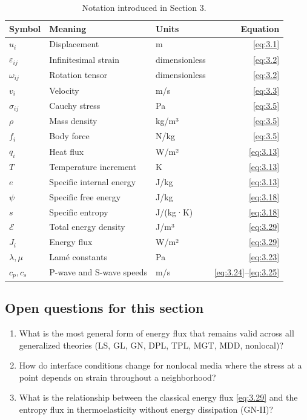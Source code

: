 \begin{table}[h]
\centering
\small
\caption{Notation introduced in Section 3.}
\label{tab:notation-sec3}
\begin{tabularx}{\textwidth}{@{}lXlr@{}}
\toprule
\textbf{Symbol} & \textbf{Meaning} & \textbf{Units} & \textbf{Equation} \\
\midrule
$u_i$ & Displacement & m & \eqref{eq:3.1} \\
$\varepsilon_{ij}$ & Infinitesimal strain & dimensionless & \eqref{eq:3.2} \\
$\omega_{ij}$ & Rotation tensor & dimensionless & \eqref{eq:3.2} \\
$v_i$ & Velocity & m/s & \eqref{eq:3.3} \\
$\sigma_{ij}$ & Cauchy stress & Pa & \eqref{eq:3.5} \\
$\rho$ & Mass density & kg/m³ & \eqref{eq:3.5} \\
$f_i$ & Body force & N/kg & \eqref{eq:3.5} \\
$q_i$ & Heat flux & W/m² & \eqref{eq:3.13} \\
$T$ & Temperature increment & K & \eqref{eq:3.13} \\
$e$ & Specific internal energy & J/kg & \eqref{eq:3.13} \\
$\psi$ & Specific free energy & J/kg & \eqref{eq:3.18} \\
$s$ & Specific entropy & J/(kg·K) & \eqref{eq:3.18} \\
$\mathcal{E}$ & Total energy density & J/m³ & \eqref{eq:3.29} \\
$J_i$ & Energy flux & W/m² & \eqref{eq:3.29} \\
$\lambda, \mu$ & Lamé constants & Pa & \eqref{eq:3.23} \\
$c_p, c_s$ & P-wave and S-wave speeds & m/s & \eqref{eq:3.24}--\eqref{eq:3.25} \\
\bottomrule
\end{tabularx}
\end{table}

\subsection{Open questions for this section}

\begin{enumerate}[label=\textbf{OQ3.\arabic*}]
\item What is the most general form of energy flux that remains valid across all generalized theories (LS, GL, GN, DPL, TPL, MGT, MDD, nonlocal)? \label{oq:3.1}
\item How do interface conditions change for nonlocal media where the stress at a point depends on strain throughout a neighborhood? \label{oq:3.2}
\item What is the relationship between the classical energy flux \cite{Biot1956} \eqref{eq:3.29} and the entropy flux in thermoelasticity without energy dissipation (GN-II)? \label{oq:3.3}
\end{enumerate}


